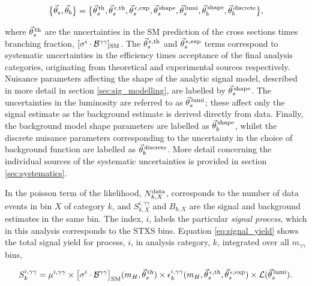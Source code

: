 \begin{equation}\label{eq:systematics_grouping}
    \big\{\vec{\theta}_s,\vec{\theta}_b\big\} = \big\{ \vec{\theta}^{\,\rm{th}}_{s}, \vec{\theta}^{\,\epsilon,{\rm{th}}}_{s}, \vec{\theta}^{\,\epsilon,{\rm{exp}}}_{s}, \vec{\theta}^{\,\rm{shape}}_{s}, \vec{\theta}^{\,\rm{lumi}}_{s}, \vec{\theta}^{\,\rm{shape}}_{b}, \vec{\theta}^{\,\rm{discrete}}_{b}  \big\},
\end{equation}

\noindent
where $\vec{\theta}^{\,\rm{th}}_{s}$ are the uncertainties in the SM prediction of the cross sections times branching fraction, $[\sigma^i \cdot \mathcal{B}^{\gamma\gamma}]_{\rm{SM}}$. The $\vec{\theta}^{\,\epsilon,{\rm{th}}}_{s}$ and $\vec{\theta}^{\,\epsilon,{\rm{exp}}}_{s}$ terms correspond to systematic uncertainties in the efficiency times acceptance of the final analysis categories, originating from theoretical and experimental sources respectively. Nuisance parameters affecting the shape of the analytic signal model, described in more detail in section \ref{sec:sig_modelling}, are labelled by $\vec{\theta}^{\,\rm{shape}}_{s}$. The uncertainties in the luminosity are referred to as $\vec{\theta}^{\,\rm{lumi}}_{s}$; these affect only the signal estimate as the background estimate is derived directly from data. Finally, the background model shape parameters are labelled as $\vec{\theta}^{\,\rm{shape}}_{b}$, whilst the discrete nuisance parameters corresponding to the uncertainty in the choice of background function are labelled as $\vec{\theta}^{\,\rm{discrete}}_{b}$. More detail concerning the individual sources of the systematic uncertainties is provided in section \ref{sec:systematics}.

In the poisson term of the likelihood, $N_{k,X}^{\rm{data}}$, corresponds to the number of data events in bin $X$ of category $k$, and $S_{k,X}^{i,\gamma\gamma}$ and $B_{k,X}$ are the signal and background estimates in the same bin. The index, $i$, labels the particular \textit{signal process}, which in this analysis corresponds to the STXS bins. Equation \ref{eq:signal_yield} shows the total signal yield for process, $i$, in analysis category, $k$, integrated over all $m_{\gamma\gamma}$ bins,

\begin{equation}\label{eq:signal_yield}
    S_k^{i,\gamma\gamma} = \mu^{i,\gamma\gamma} \times \big[\sigma^i \cdot \mathcal{B}^{\gamma\gamma} \big]_{\rm{SM}}(m_H,\vec{\theta}^{\,\rm{th}}_{s}) \times \epsilon^{i,\gamma\gamma}_k(m_H,\vec{\theta}^{\,\epsilon,{\rm{th}}}_{s}, \vec{\theta}^{\,\epsilon,{\rm{exp}}}_{s}) \times \mathcal{L}(\vec{\theta}^{\,\rm{lumi}}_{s}).
\end{equation}

